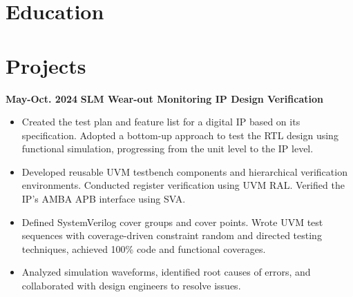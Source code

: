 \documentclass[11pt,a4paper,sans]{moderncv}
\begin{document}
\makecvtitle
\vspace{-1.5cm} 

\section{Education}



\vspace{-0.3cm} 

\section{Projects}

\cventry
{\textnormal{\textbf{May-Oct. 2024}}}
{\textnormal{\textbf{SLM Wear-out Monitoring IP Design Verification}}}
{}{}{}
{
    \begin{itemize}
        \item Created the test plan and feature list for a digital IP based on its specification. Adopted a bottom-up approach to test the RTL design using functional simulation, progressing from the unit level to the IP level.
        \item Developed reusable UVM testbench components and hierarchical verification environments. Conducted register verification using UVM RAL. Verified the IP's AMBA APB interface using SVA.
        \item Defined SystemVerilog cover groups and cover points. Wrote UVM test sequences with coverage-driven constraint random and directed testing techniques, achieved 100\% code and functional coverages.
        \item Analyzed simulation waveforms, identified root causes of errors, and collaborated with design engineers to resolve issues.
    \end{itemize}
}
\end{document}
